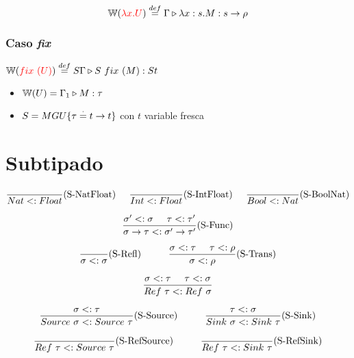 \documentclass[10pt,a4paper]{article}
\begin{document}
$$\mathbb{W}({\color{red}\lambda x. U}) \overset{def}{=} \Gamma\triangleright \lambda x: s . M : s\to\rho$$

\subsubsection*{Caso \textit{fix}}
$\mathbb{W}({\color{red}fix~(U)}) \overset{def}{=} S\Gamma\triangleright S~fix~(M) : St$
\begin{centrado}
\begin{itemize}
\item $\mathbb{W}(U) = \Gamma_1\triangleright M : \tau$
\item $S = MGU\{\tau\overset{\cdot}{=} t\to t\}$ con $t$ variable fresca
\end{itemize}
\end{centrado}

\newpage
\section{Subtipado}

\begin{align*}
\frac{}{Nat <: Float}(\text{S-NatFloat}) \hspace*{5mm}\frac{}{Int <: Float}(\text{S-IntFloat}) \hspace*{5mm}\frac{}{Bool <: Nat}(\text{S-BoolNat})
\end{align*}

$$\frac{\sigma' <: \sigma\hspace*{5mm}\tau <: \tau'}{\sigma\to\tau <: \sigma'\to\tau'}(\text{S-Func})$$

$$\frac{}{\sigma <: \sigma}(\text{S-Refl}) \hspace*{1cm}\frac{\sigma <:\tau\hspace*{5mm}\tau <: \rho}{\sigma <: \rho}(\text{S-Trans})$$

$$\frac{\sigma <: \tau\hspace*{5mm} \tau <: \sigma}{Ref~\tau <: Ref~\sigma}$$

\begin{align*}
\frac{\sigma <: \tau}{Source~\sigma <: Source~\tau}(\text{S-Source})\hspace*{1cm}\frac{\tau <: \sigma}{Sink~\sigma <: Sink~\tau}(\text{S-Sink})
\end{align*}

\begin{align*}
\frac{}{Ref~\tau <: Source~\tau}(\text{S-RefSource})\hspace*{1cm}\frac{}{Ref~\tau <: Sink~\tau}(\text{S-RefSink})
\end{align*}
\end{document}

